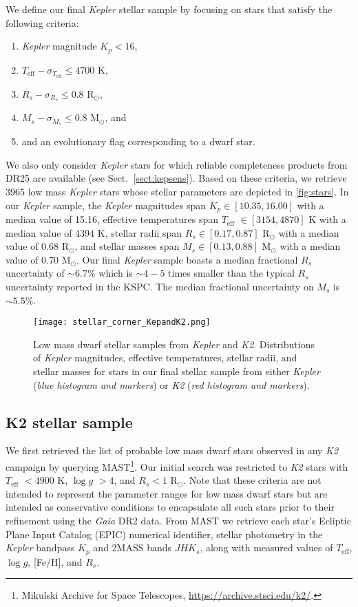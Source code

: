 \documentclass[twocolumn]{emulateapj}
\newcommand{\gaia}[1]{\emph{Gaia}#1}
\newcommand{\kepler}[1]{\emph{Kepler}#1}
\newcommand{\ktwo}[1]{\emph{K2}#1}
\newcommand{\teff}[1]{$T_{\text{eff}}$#1}
\newcommand{\logg}[1]{$\log{g}$#1}
\begin{document}
We define our final \kepler{} stellar sample by focusing on stars that satisfy the following criteria:

\begin{enumerate}
\item \kepler{} magnitude $K_p < 16$,
\item $T_{\text{eff}} - \sigma_{T_{\text{eff}}} \leq 4700$ K,
\item $R_s - \sigma_{R_s} \leq 0.8$ R$_{\odot}$,
\item $M_s - \sigma_{M_s} \leq 0.8$ M$_{\odot}$, and
\item and an evolutionary flag corresponding to a dwarf star. 
\end{enumerate}

\noindent We also only consider \kepler{} stars for which reliable completeness products from DR25
are available (see Sect.~\ref{sect:kepsens}). Based on these criteria, we retrieve 3965 low mass \kepler{}
stars whose stellar parameters are depicted in \autoref{fig:stars}.
In our \kepler{} sample, the \kepler{} magnitudes span $K_p \in [10.35, 16.00]$ with a median value of 15.16,
effective temperatures span \teff{} $\in [3154, 4870]$ K with a median value of 4394 K,
stellar radii span $R_s \in [0.17, 0.87]$ R$_{\odot}$ with a median value of 0.68 R$_{\odot}$, and
stellar masses span $M_s \in [0.13, 0.88]$ M$_{\odot}$ with a median value of 0.70 M$_{\odot}$.
Our final \kepler{} sample boasts a median fractional $R_s$ uncertainty of $\sim 6.7$\% which is $\sim 4-5$
times smaller than the typical $R_s$ uncertainty reported in the KSPC. The median fractional uncertainty on
$M_s$ is $\sim 5.5$\%.

\begin{figure}
  \centering
  \texttt{[image: stellar\_corner\_KepandK2.png]}
  \caption{Low mass dwarf stellar samples from \kepler{} and \ktwo{.} Distributions of \kepler{} magnitudes,
    effective temperatures, stellar radii, and stellar masses for stars in our final stellar sample from either
    \kepler{} (\emph{blue histogram and markers}) or \ktwo{} (\emph{red histogram and markers}).}
  \label{fig:stars}
\end{figure}

\subsection{K2 stellar sample}
We first retrieved the list of probable low mass dwarf stars observed in any \ktwo{} campaign by querying
MAST\footnote{Mikulski Archive for Space Telescopes, \url{https://archive.stsci.edu/k2/}.}. Our initial
search was restricted to \ktwo{} stars with \teff{} $<4900$ K, \logg{} $>4$, and $R_s<1$ R$_{\odot}$. Note that these
criteria are not intended to represent the parameter ranges for low mass dwarf stars but are intended as
conservative conditions to encapsulate all such stars prior to their refinement using the \gaia{} DR2
data. From MAST we retrieve each star's Ecliptic Plane Input Catalog
(EPIC) numerical identifier, stellar photometry in the \kepler{} bandpass $K_p$ and 2MASS bands $JHK_s$, along
with measured values of \teff{,} \logg{,} [Fe/H], and $R_s$.
\end{document}
